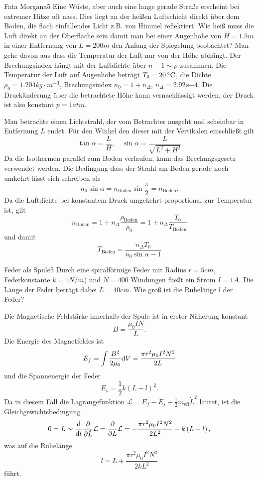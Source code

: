 \begin{problem}{Fata Morgana}{5}
Eine Wüste, aber auch eine lange gerade Straße erscheint bei extremer Hitze oft nass. Dies liegt an der heißen Luftschicht direkt über dem Boden, die flach einfallendes Licht z.B. von Himmel reflektiert. Wie heiß muss die Luft direkt an der Oberfläche sein damit man bei einer Augenhöhe von $H = 1.5 \unit{m}$ in einer Entfernung von $L = 200 \unit{m}$ den Anfang der Spiegelung beobachtet? Man gehe davon aus dass die Temperatur der Luft nur von der Höhe abhängt. Der Brechungsindex hängt mit der Luftdichte über $n-1 \sim \rho$ zusammen. Die Temperatur der Luft auf Augenhöhe beträgt $T_0 = 20 \,^\circ\mathrm{C}$, die Dichte $\rho_0 = 1.204 \unit{kg \cdot m^{-3}}$, Brechungsindex $n_0 = 1 + n_\Delta$, $n_\Delta = 2.92\ee{-4}$. \hinweis Die Druckänderung über die betrachtete Höhe kann vernachlässigt werden, der Druck ist also konstant $p = 1 \unit{atm}$.
\begin{solution}
Man betrachte einen Lichtstrahl, der vom Betrachter ausgeht und scheinbar in Entfernung $L$ endet. Für den Winkel den dieser mit der Vertikalen einschließt gilt
\[
\tan\alpha = \frac{L}{H}, \quad \sin\alpha = \frac{L}{\sqrt{L^2 + H^2}}
\]
Da die Isothermen parallel zum Boden verlaufen, kann das Brechungsgesetz verwendet werden. Die Bedingung dass der Strahl am Boden gerade noch umkehrt lässt sich schreiben als
\[
n_0 \sin\alpha = n_\mathrm{Boden} \sin\frac\pi2 = n_\mathrm{Boden}.
\]
Da die Luftdichte bei konstantem Druck umgekehrt proportional zur Temperatur ist, gilt
\[
n_\mathrm{Boden} = 1 + n_\Delta \frac{\rho_\mathrm{Boden}}{\rho_0} = 1 + n_\Delta \frac{T_0}{T_\mathrm{Boden}}
\]
und damit
\[
T_\mathrm{Boden} = \frac{ n_\Delta T_0 }{ n_0 \sin\alpha - 1 }
\]
\end{solution}
\end{problem}


\begin{problem}{Feder als Spule}{5}
Durch eine spiralförmige Feder mit Radius $r = 5 \unit{cm}$, Federkonstante $k = 1 \unit{N/m}$) und $N = 400$ Windungen fließt ein Strom $I = 1 \unit{A}$. Die Länge der Feder beträgt dabei $L = 40 \unit{cm}$. Wie groß ist die Ruhelänge $l$ der Feder?
\begin{solution}
Die Magnetische Feldstärke innerhalb der Spule ist in erster Näherung konstant
\[
B = \frac{\mu_0 I N}{L}.
\]
Die Energie des Magnetfeldes ist
\[
E_f = \int \frac{B^2}{2 \mu_0} \mathrm{d} V = \frac{\pi r^2 \mu_0 I^2 N^2 }{2 L}
\]
und die Spannenergie der Feder
\[
E_s = \frac12 k \left( L - l \right)^2.
\]
Da in diesem Fall die Lagrangefunktion $\mathcal L =E_f - E_s + \frac12 m_\mathrm{eff} \dot L^2$ lautet, ist die Gleichgewichtsbedingung
\[
0 = \ddot L \sim \frac{\mathrm{d}}{\mathrm{d} t} \frac{\partial}{\partial\dot L} \mathcal L = \frac{\partial}{\partial L} \mathcal L =  - \frac{\pi r^2 \mu_0 I^2 N^2 }{2 L^2} - k \left( L - l \right),
\]
was auf die Ruhelänge
\[
l  =  L + \frac{\pi r^2 \mu_0 I^2 N^2 }{2 k L^2}
\]
führt.
\end{solution}
\end{problem}


